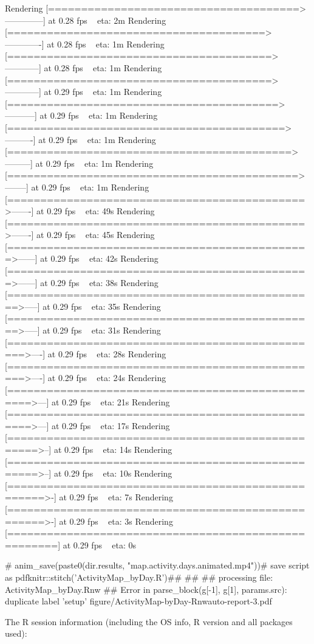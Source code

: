 \documentclass{article}\usepackage[]{graphicx}\usepackage[]{color}
\begin{document}
Rendering [======================================>--------------] at 0.28 fps ~ eta:  2m
Rendering [=======================================>-------------] at 0.28 fps ~ eta:  1m
Rendering [========================================>------------] at 0.28 fps ~ eta:  1m
Rendering [========================================>------------] at 0.29 fps ~ eta:  1m
Rendering [=========================================>-----------] at 0.29 fps ~ eta:  1m
Rendering [==========================================>----------] at 0.29 fps ~ eta:  1m
Rendering [===========================================>---------] at 0.29 fps ~ eta:  1m
Rendering [============================================>--------] at 0.29 fps ~ eta:  1m
Rendering [=============================================>-------] at 0.29 fps ~ eta: 49s
Rendering [=============================================>-------] at 0.29 fps ~ eta: 45s
Rendering [==============================================>------] at 0.29 fps ~ eta: 42s
Rendering [==============================================>------] at 0.29 fps ~ eta: 38s
Rendering [===============================================>-----] at 0.29 fps ~ eta: 35s
Rendering [===============================================>-----] at 0.29 fps ~ eta: 31s
Rendering [================================================>----] at 0.29 fps ~ eta: 28s
Rendering [================================================>----] at 0.29 fps ~ eta: 24s
Rendering [=================================================>---] at 0.29 fps ~ eta: 21s
Rendering [=================================================>---] at 0.29 fps ~ eta: 17s
Rendering [==================================================>--] at 0.29 fps ~ eta: 14s
Rendering [==================================================>--] at 0.29 fps ~ eta: 10s
Rendering [===================================================>-] at 0.29 fps ~ eta:  7s
Rendering [===================================================>-] at 0.29 fps ~ eta:  3s
Rendering [=====================================================] at 0.29 fps ~ eta:  0s
                                                                                        
# anim_save(paste0(dir.results, "map.activity.days.animated.mp4"))# save script as pdfknitr::stitch('ActivityMap_byDay.R')## 
## 
## processing file: ActivityMap_byDay.Rnw
## Error in parse_block(g[-1], g[1], params.src): duplicate label 'setup'
figure/ActivityMap-byDay-Rnwauto-report-3.pdf

The R session information (including the OS info, R version and all
packages used):
\end{document}

